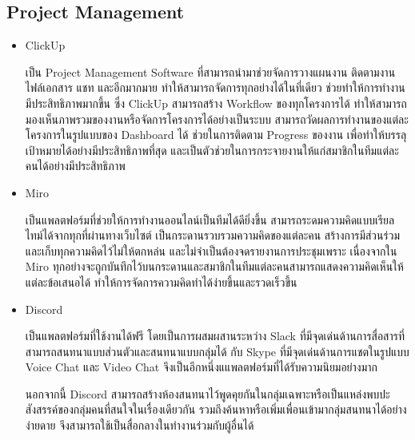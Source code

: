 \documentclass[12pt,oneside,openright,a4paper]{cpe-thai-project}
\begin{document}
  \subsection{Project Management}
    \begin{itemize}
      \item ClickUp
        
        \hspace{1cm}เป็น Project Management Software ที่สามารถนำมาช่วยจัดการวางแผนงาน ติดตามงาน ไฟล์เอกสาร แชท และอีกมากมาย 
        ทำให้สามารถจัดการทุกอย่างได้ในที่เดียว ช่วยทำให้การทำงานมีประสิทธิภาพมากขึ้น ซึ่ง ClickUp สามารถสร้าง Workflow ของทุกโครงการได้ 
        ทำให้สามารถมองเห็นภาพรวมของงานหรือจัดการโครงการได้อย่างเป็นระบบ 
        สามารถวัดผลการทำงานของแต่ละโครงการในรูปแบบของ Dashboard ได้ ช่วยในการติดตาม Progress ของงาน เพื่อทำให้บรรลุเป้าหมายได้อย่างมีประสิทธิภาพที่สุด 
        และเป็นตัวช่วยในการกระจายงานให้แก่สมาชิกในทีมแต่ละคนได้อย่างมีประสิทธิภาพ \cite{clickup}
      
      \item Miro
        
        \hspace{1cm}เป็นแพลตฟอร์มที่ช่วยให้การทำงานออนไลน์เป็นทีมได้ดียิ่งขึ้น สามารถระดมความคิดแบบเรียลไทม์ได้จากทุกที่ผ่านทางเว็บไซต์
        เป็นกระดานรวบรวมความคิดของแต่ละคน สร้างการมีส่วนร่วมและเก็บทุกความคิดไว้ไม่ให้ตกหล่น และไม่จำเป็นต้องจดรายงานการประชุมเพราะ 
        เนื่องจากใน Miro ทุกอย่างจะถูกบันทึกไว้บนกระดานและสมาชิกในทีมแต่ละคนสามารถแสดงความคิดเห็นให้แต่ละข้อเสนอได้ ทำให้การจัดการความคิดทำได้ง่ายขึ้นและรวดเร็วขึ้น \cite{miro}
      
      \item Discord
        
        \hspace{1cm}เป็นแพลตฟอร์มที่ใช้งานได้ฟรี โดยเป็นการผสมผสานระหว่าง Slack ที่มีจุดเด่นด้านการสื่อสารที่สามารถสนทนาแบบส่วนตัวและสนทนาแบบกลุ่มได้ 
        กับ Skype ที่มีจุดเด่นด้านการแชตในรูปแบบ Voice Chat และ Video Chat จึงเป็นอีกหนึ่งแแพลตฟอร์มที่ได้รับความนิยมอย่างมาก
        
        \hspace{1cm}นอกจากนี้ Discord สามารถสร้างห้องสนทนาไว้พูดคุยกันในกลุ่มเฉพาะหรือเป็นแหล่งพบปะสังสรรค์ของกลุ่มคนที่สนใจในเรื่องเดียวกัน 
        รวมถึงค้นหาหรือเพิ่มเพื่อนเข้ามากลุ่มสนทนาได้อย่างง่ายดาย จึงสามารถใช้เป็นสื่อกลางในทำงานร่วมกับผู้อื่นได้ \cite{discord}
    \end{itemize}

\end{document}
